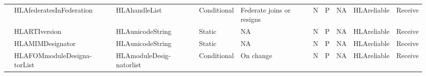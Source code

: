 \begin{landscape}
\begin{momtabletypeset}[8.00]
{{\begin{tabular}{|Y{90.88pt}|Y{96.62pt}|Y{69.32pt}|Y{45.50pt}|Y{96.56pt}|Y{24.62pt}|Y{24.62pt}|Y{48.56pt}|Y{65.24pt}|Y{36.31pt}|}
                    & HLAfederatesInFederation                     & HLAhandleList                               & Conditional                                                & Federate joins or resigns                                                                                                                                                                                                                                                                                                               & N                                                   & P & NA & HLAreliable & Receive \\
                    & HLARTIversion                                & HLAunicodeString                            & Static                                                     & NA                                                                                                                                                                                                                                                                                                                                      & N                                                   & P                                                   & NA                                                                  & HLAreliable                                       & Receive                                  \\
                    & HLAMIMDesignator                             & HLAunicodeString                            & Static                                                     & NA                                                                                                                                                                                                                                                                                                                                      & N                                                   & P                                                   & NA                                                                  & HLAreliable                                       & Receive                                  \\
                    & HLAFOMmoduleDesigna-\newline torList         & HLAmoduleDesig-\newline natorlist           & Conditional & On change & N & P & NA & HLAreliable & Receive \\

\end{tabular}}}
\end{momtabletypeset}
\end{landscape}
